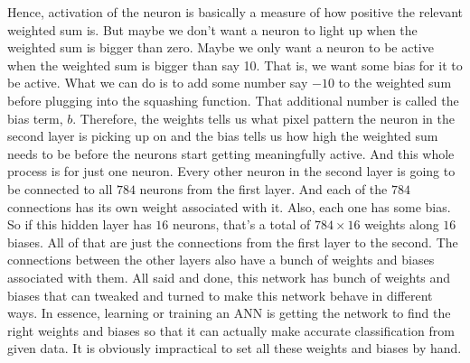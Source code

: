 \documentclass[master]{thesis-uestc}
\begin{document}
Hence, activation of the neuron is basically a measure of how positive the relevant weighted sum is. But maybe we don't want a neuron to light up when the weighted sum is bigger than zero. Maybe we only want a neuron to be active when the weighted sum is bigger than say 10. That is, we want some bias for it to be active. What we can do is to add some number say $-10$ to the weighted sum before plugging into the squashing function. That additional number is called the bias term, $b$. Therefore, the weights tells us what pixel pattern the neuron in the second layer is picking up on and the bias tells us how high the weighted sum needs to be before the neurons start getting meaningfully active. And this whole process is for just one neuron. Every other neuron in the second layer is going to be connected to all $784$ neurons from the first layer. And each of the $784$ connections has its own weight associated with it. Also, each one has some bias. So if this hidden layer has $16$ neurons, that's a total of $784 \times 16$ weights along $16$ biases. All of that are just the connections from the first layer to the second. The connections between the other layers also have a bunch of weights and biases associated with them. All said and done, this network has bunch of weights and biases that can tweaked and turned to make this network behave in different ways. In essence, learning or training an ANN is getting the network to find the right weights and biases so that it can actually make accurate classification from given data. It is obviously impractical to set all these weights and biases by hand.
\end{document}

